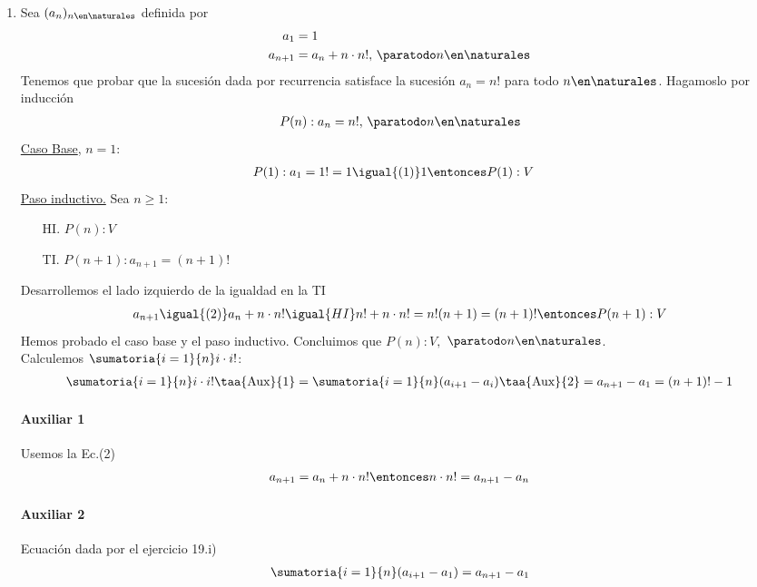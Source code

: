 \begin{enumerate}[label=\roman*)]
    \item Sea $(a_n)_{n \en \naturales }$ definida por
    \setcounter{equation}{0}
    \begin{align}
        a_1 &= 1 \\
        a_{n+1} &= a_n + n \cdot n!,\, \paratodo n \en \naturales 
    \end{align} 
    Tenemos que probar que la sucesión dada por recurrencia satisface la sucesión $a_n = n!$ para todo $n \en 
    \naturales $. 
    Hagamoslo por inducción
    \begin{align*}
        P(n): a_n = n!,\, \paratodo n \en \naturales 
    \end{align*}
    \underline{Caso Base}, $n = 1$:
	    \begin{align*}
		    &P(1): a_1 = 1! = 1 \igual{(1)} 1 \entonces P(1):V
	    \end{align*}
	\underline{Paso inductivo.} Sea $n \geq 1$:
	\begin{enumerate}
        \item[HI.] $P(n): V$
        \item[TI.] $P(n+1): a_{n+1} = (n+1)!$
    \end{enumerate}
 	Desarrollemos el lado izquierdo de la igualdad en la TI
    \begin{align*}
  	    a_{n+1} \igual{(2)} a_n + n \cdot n! \igual{HI} n! + n \cdot n! = n!(n + 1) = (n+1)! 
        \entonces P(n+1):V
    \end{align*}
    Hemos probado el caso base y el paso inductivo. Concluimos que $P(n):V,$ $\paratodo n \en \naturales $.\\

    Calculemos $\displaystyle \sumatoria{i=1}{n} i \cdot i! $:
    \begin{align*}
            \sumatoria{i=1}{n}  i \cdot i! \taa{\text{Aux}}{1}= \sumatoria{i=1}{n}  (a_{i+1} - a_i) \taa{\text{Aux}}{2}=
        a_{n+1} - a_1 = (n+1)! - 1
    \end{align*}

    \paragraph{Auxiliar 1}{
        Usemos la Ec.(2)
        \begin{align*}
            a_{n+1} = a_n + n \cdot n! \entonces n \cdot n! = a_{n+1} - a_n
        \end{align*}
    }
    \paragraph{Auxiliar 2}{
        Ecuación dada por el ejercicio 19.i)
        \begin{align*}
            \sumatoria{i=1}{n} (a_{i+1} - a_1) = a_{n+1} - a_1
        \end{align*}
    }


\end{enumerate}
